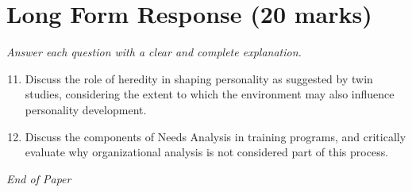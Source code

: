 \documentclass[12pt]{article}
\begin{document}
\section*{Long Form Response (20 marks)}
\textit{Answer each question with a clear and complete explanation.}
\begin{enumerate}[label=\arabic*.]
\setcounter{enumi}{10}
\item Discuss the role of heredity in shaping personality as suggested by twin studies, considering the extent to which the environment may also influence personality development.
\item Discuss the components of Needs Analysis in training programs, and critically evaluate why organizational analysis is not considered part of this process.
\end{enumerate}

\vfill
\noindent\textit{End of Paper}
\end{document}
